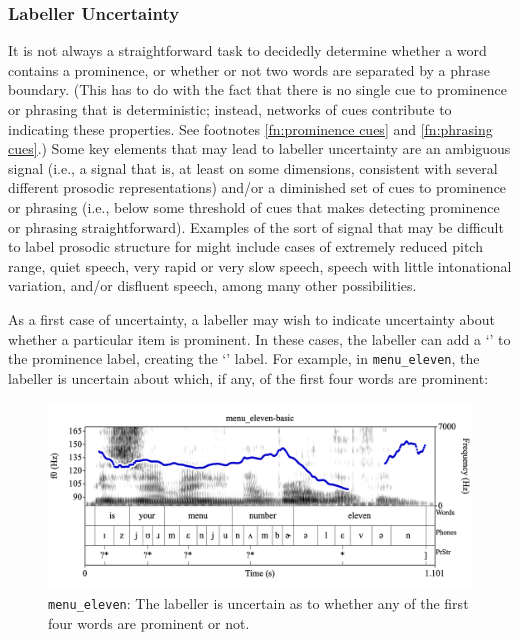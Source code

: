 \documentclass[11pt, twoside]{memoir}
\def\textlabel#1{{\relsize{-.5}\fontspec[Mapping=tex-text]{Roboto Mono}{#1}}}
\begin{document}
\subsubsection{Labeller Uncertainty}\label{sec:labeller-uncertainty}

It is not always a straightforward task to decidedly determine whether a word contains a prominence, or whether or not two words are separated by a phrase boundary. (This has to do with the fact that there is no single cue to prominence or phrasing that is deterministic; instead, networks of cues contribute to indicating these properties. See footnotes \ref{fn:prominence cues} and \ref{fn:phrasing cues}.) Some key elements that may lead to labeller uncertainty are an ambiguous signal (i.e., a signal that is, at least on some dimensions, consistent with several different prosodic representations) and/or a diminished set of cues to prominence or phrasing (i.e., below some threshold of cues that makes detecting prominence or phrasing straightforward). Examples of the sort of signal that may be difficult to label prosodic structure for might include cases of extremely reduced pitch range, quiet speech, very rapid or very slow speech, speech with little intonational variation, and/or disfluent speech, among many other possibilities.

As a first case of uncertainty, a labeller may wish to indicate uncertainty about whether a particular item is prominent. In these cases, the labeller can add a ‘\textlabel{?}’ to the prominence label, creating the ‘\textlabel{?*}’ label. For example, in \texttt{menu\_eleven}, the labeller is uncertain about which, if any, of the first four words are prominent:

\begin{figure}[H]
\centering
%
\includegraphics[width=.875\linewidth]{PrStr-menu_eleven-basic.png}
%
\caption{\texttt{menu\_eleven}: The labeller is uncertain as to whether any of the first four words are prominent or not.%
\label{fig:menu eleven PrStr uncertainty}%
}
\end{figure}
\end{document}
